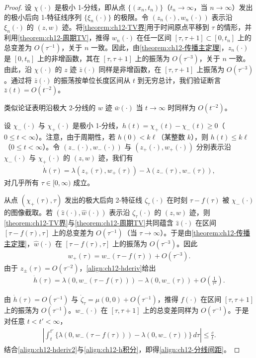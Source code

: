 \documentclass[../../main.tex]{subfiles}
\begin{document}
\begin{proof}
设 $\chi(\cdot)$ 是极小 1-分线，即从点 $\{(x_n,t_n)\}$（$t_n\to\infty$，当 $n\to\infty$）发出的极小后向 1-特征线序列 $\{\xi_n(\cdot)\}$ 的极限。令 $(z_n(\cdot),w_n(\cdot))$ 表示沿 $\xi_n(\cdot)$ 的 $(z,w)$ 迹。将\cref{theorem:ch12-TV界}用于时间原点平移到 $\tau$ 的情形，并利用\cref{theorem:ch12-周期TV}，推得 $w_n(\cdot)$ 在任一区间 $[\tau,\tau+1]\subset[0,t_n]$ 上的总变差为 $O(\tau^{-1})$，关于 $n$ 一致。因此，由\cref{theorem:ch12-传播主定理}，$z_n(\cdot)$ 是 $[0,t_n]$ 上的非增函数，其在 $[\tau,\tau+1]$ 上的振荡为 $O(\tau^{-3})$，关于 $n$ 一致。由此，沿 $\chi(\cdot)$ 的 $z$ 迹 $\bar z(\cdot)$ 同样是非增函数，在 $[\tau,\tau+1]$ 上振荡为 $O(\tau^{-3})$。通过将 $\bar z(\cdot)$ 的振荡按单位长度区间从 $t$ 到无穷总计，我们验证断言 $\bar z(t)=O(t^{-2})$。

类似论证表明沿极大 2-分线的 $w$ 迹 $\bar w(\cdot)$ 当 $t\to\infty$ 时同样为 $O(t^{-2})$。

设 $\chi_-(\cdot)$ 与 $\chi_+(\cdot)$ 是极小 1-分线，$h(t)=\chi_+(t)-\chi_-(t)\geqslant0$（$0\leqslant t<\infty$）。注意，由于周期性，若 $h(0)<k\ell$（某整数 $k$），则 $h(t)\leqslant k\ell$（$0\leqslant t<\infty$）。令 $(z_-(\cdot),w_-(\cdot))$ 与 $(z_+(\cdot),w_+(\cdot))$ 分别表示沿 $\chi_-(\cdot)$ 与 $\chi_+(\cdot)$ 的 $(z,w)$ 迹，我们有
\begin{align}
\dot h(\tau)=\lambda(z_+(\tau),w_+(\tau))-\lambda(z_-(\tau),w_-(\tau)),
\label{align:ch12-hderiv}
\end{align}
对几乎所有 $\tau\in[0,\infty)$ 成立。

从点 $(\chi_+(\tau),\tau)$ 发出的极大后向 2-特征线 $\zeta_\tau(\cdot)$ 在时刻 $\tau-f(\tau)$ 被 $\chi_-(\cdot)$ 的图像截取。若 $(\hat z(\cdot),\hat w(\cdot))$ 表示沿 $\zeta_\tau(\cdot)$ 的 $(z,w)$ 迹，则\cref{theorem:ch12-TV界}与\cref{theorem:ch12-周期TV}共同蕴含 $\hat z(\cdot)$ 在区间 $[\tau-f(\tau),\tau]$ 上的总变差为 $O(\tau^{-1})$（当 $\tau\to\infty$）。于是由\cref{theorem:ch12-传播主定理}，$\hat w(\cdot)$ 在 $[\tau-f(\tau),\tau]$ 上的振荡为 $O(\tau^{-3})$。因此
\begin{align}
w_+(\tau)=w_-(\tau-f(\tau))+O(\tau^{-3}).
\label{align:ch12-w+}
\end{align}
由于 $z_\pm(\tau)=O(\tau^{-2})$，\eqref{align:ch12-hderiv}给出
\begin{align}
\dot h(\tau)=\lambda(0,w_-(\tau-f(\tau)))-\lambda(0,w_-(\tau))+O\left(\frac1{\tau^2}\right).
\label{align:ch12-hderiv2}
\end{align}

由 $\dot h(\tau)=O(\tau^{-1})$ 与 $\dot\zeta_\tau=\mu(0,0)+O(\tau^{-1})$，推得 $f(\cdot)$ 在区间 $[\tau,\tau+1]$ 上的振荡为 $O(\tau^{-1})$。$w_-(\cdot)$ 在 $[\tau,\tau+1]$ 上的总变差同样为 $O(\tau^{-1})$。于是对任意 $t<t'<\infty$，
\begin{align}
\left|\int_t^{t'}\{\lambda(0,w_-(\tau-f(\tau)))-\lambda(0,w_-(\tau))\}\,d\tau\right|\leqslant\frac{c}{t}.
\label{align:ch12-h积分}
\end{align}
结合\eqref{align:ch12-hderiv2}与\eqref{align:ch12-h积分}，即得\eqref{align:ch12-分线间距}。


\end{proof}
\end{document}
